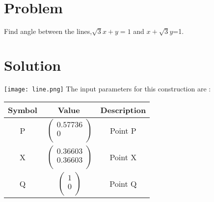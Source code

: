 \documentclass[10pt, a4paper]{article}
\title{\mytitle}
\author{\myauthor\hspace{1em}\\\contact\\IITH\hspace{0.5em}-\hspace{0.5em}\mymodule}
\date{}
\begin{document}
	\maketitle
\section*{Problem}
\fi
   Find angle between the lines,$\sqrt{3}x+y=1$ and $x+\sqrt{3}y$=1.
   \\
   \solution 
   \iffalse
   \section*{Solution}
   \texttt{[image: line.png]}
   The input parameters for this construction are :
   \begin{center}
\begin{tabular}{|c|c|c|}
	\hline
	\textbf{Symbol}&\textbf{Value}&\textbf{Description}\\
	\hline
	P&$\
	\begin{pmatrix}
		0.57736 \\
		0 \\
	\end{pmatrix}$%
	&Point P\\ 
	\hline
	X&$\
	\begin{pmatrix}
		0.36603 \\
		0.36603 \\
	\end{pmatrix}$%
	&Point X\\
	\hline
	Q&$\
	\begin{pmatrix}
		1 \\
		0 \\
	\end{pmatrix}$%
	&Point Q\\
	
	\hline
\end{tabular}
\end{center}
\end{document}
